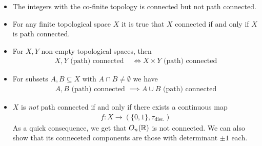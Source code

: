 \begin{rem}
  \begin{itemize}
    \item The integers with the co-finite topology is connected but not path connected.
    \item For any finite topological space $X$ it is true that $X$ connected if and only if $X$ is path connected.
    \item For $X,Y$ non-empty topological spaces, then
      \begin{align*}
        X, Y \text{ (path) connected } &\iff X \times Y \text{ (path) connected}
      \end{align*}
    \item For subsets $A,B \subseteq X$ with $A \cap B \neq \emptyset$ we have
\begin{align*}
  A,B \text{ (path) connected } \implies A \cup B \text{ (path) connected}  
\end{align*}
    \item $X$ is \emph{not} path connected if and only if there exists a continuous map
      \begin{align*}
        f: X \to (\{0,1\}, \tau_{\text{disc.}})
      \end{align*}
      As a quick consequence, we get that $O_n(\mathbb{R})$ is not connected. We can also show that its conneceted components are those with determinant $\pm 1$ each.
  \end{itemize}
\end{rem}
